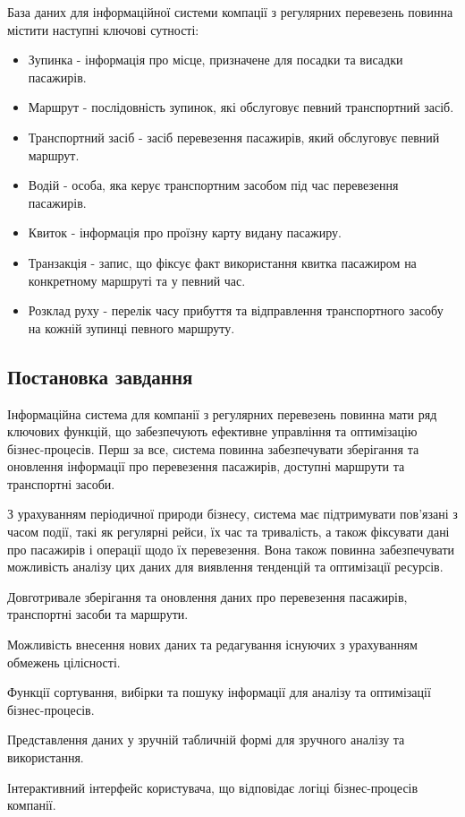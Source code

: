 \documentclass[oneside,14pt]{extarticle}
\begin{document}
База даних для інформаційної системи компації з регулярних перевезень повинна містити наступні ключові сутності:
\begin{itemize}
\item Зупинка - інформація про місце, призначене для посадки та висадки пасажирів.
\item Маршрут - послідовність зупинок, які обслуговує певний транспортний засіб.
\item Транспортний засіб - засіб перевезення пасажирів, який обслуговує певний маршрут.
\item Водій - особа, яка керує транспортним засобом під час перевезення пасажирів.
\item Квиток - інформація про проїзну карту видану пасажиру.
\item Транзакція - запис, що фіксує факт використання квитка пасажиром на конкретному маршруті та у певний час.
\item Розклад руху - перелік часу прибуття та відправлення транспортного засобу на кожній зупинці певного маршруту.
\end{itemize}

\subsection{Постановка завдання}
Інформаційна система для компанії з регулярних перевезень повинна мати ряд ключових функцій, що забезпечують ефективне управління та оптимізацію бізнес-процесів. Перш за все, система повинна забезпечувати зберігання та оновлення інформації про перевезення пасажирів, доступні маршрути та транспортні засоби.

З урахуванням періодичної природи бізнесу, система має підтримувати пов’язані з часом події, такі як регулярні рейси, їх час та тривалість, а також фіксувати дані про пасажирів і операції щодо їх перевезення. Вона також повинна забезпечувати можливість аналізу цих даних для виявлення тенденцій та оптимізації ресурсів.

\begin{list}{•}{Інформаційна система для компанії з регулярних перевезень повинна мати наступні функції:}
    \item Довготривале зберігання та оновлення даних про перевезення пасажирів, транспортні засоби та маршрути.
    \item Можливість внесення нових даних та редагування існуючих з урахуванням обмежень цілісності.
    \item Функції сортування, вибірки та пошуку інформації для аналізу та оптимізації бізнес-процесів.
    \item Представлення даних у зручній табличній формі для зручного аналізу та використання.
    \item Інтерактивний інтерфейс користувача, що відповідає логіці бізнес-процесів компанії.
\end{list}
\newpage
\end{document}
